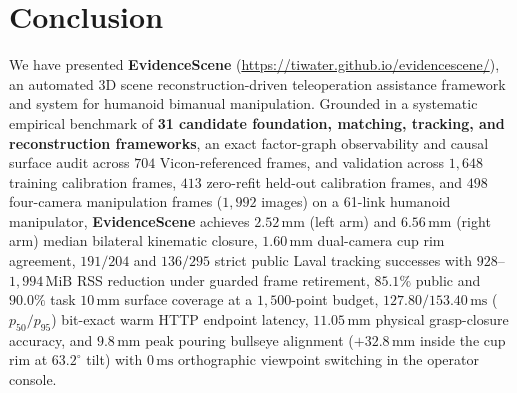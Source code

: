 \documentclass[10pt,journal]{IEEEtran}
\begin{document}
\section{Conclusion}
\label{sec:conclusion}
We have presented \textbf{EvidenceScene} (\url{https://tiwater.github.io/evidencescene/}), an automated 3D scene reconstruction-driven teleoperation assistance framework and system for humanoid bimanual manipulation. Grounded in a systematic empirical benchmark of \textbf{31 candidate foundation, matching, tracking, and reconstruction frameworks}, an exact factor-graph observability and causal surface audit across $704$ Vicon-referenced frames, and validation across $1{,}648$ training calibration frames, $413$ zero-refit held-out calibration frames, and $498$ four-camera manipulation frames ($1{,}992$ images) on a 61-link humanoid manipulator, \textbf{EvidenceScene} achieves $2.52\,\mathrm{mm}$ (left arm) and $6.56\,\mathrm{mm}$ (right arm) median bilateral kinematic closure, $1.60\,\mathrm{mm}$ dual-camera cup rim agreement, $191/204$ and $136/295$ strict public Laval tracking successes with $928$--$1{,}994\,\mathrm{MiB}$ RSS reduction under guarded frame retirement, $85.1\%$ public and $90.0\%$ task $10\,\mathrm{mm}$ surface coverage at a $1{,}500$-point budget, $127.80 / 153.40\,\mathrm{ms}$ ($p_{50}/p_{95}$) bit-exact warm HTTP endpoint latency, $11.05\,\mathrm{mm}$ physical grasp-closure accuracy, and $9.8\,\mathrm{mm}$ peak pouring bullseye alignment ($+32.8\,\mathrm{mm}$ inside the cup rim at $63.2^\circ$ tilt) with $0\,\mathrm{ms}$ orthographic viewpoint switching in the operator console.
\end{document}

